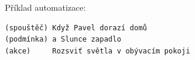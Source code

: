Příklad automatizace:

\begin{lstlisting}
(spouštěč) Když Pavel dorazí domů
(podmínka) a Slunce zapadlo
(akce) 	   Rozsviť světla v obývacím pokoji
\end{lstlisting}







